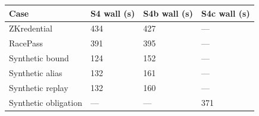 \begin{tabular}{llll}
\toprule
Case & S4 wall (s) & S4b wall (s) & S4c wall (s) \\
\midrule
ZKredential & 434 & 427 & --- \\
RacePass & 391 & 395 & --- \\
Synthetic bound & 124 & 152 & --- \\
Synthetic alias & 132 & 161 & --- \\
Synthetic replay & 132 & 160 & --- \\
Synthetic obligation & --- & --- & 371 \\
\bottomrule
\end{tabular}
